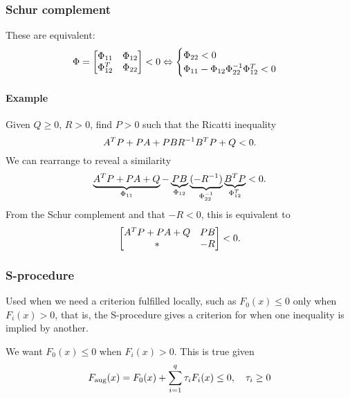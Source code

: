 \subsubsection{Schur complement}
These are equivalent:
\begin{equation}
  \Phi =
  \begin{bmatrix}
    \Phi_{11} & \Phi_{12} \\
    \Phi_{12}^{T} & \Phi_{22}
  \end{bmatrix}
  < 0
  \Leftrightarrow
  \begin{cases}
    \Phi_{22} < 0 \\
    \Phi_{11} - \Phi_{12} \Phi_{22}^{-1} \Phi_{12}^{T} < 0
  \end{cases}
\end{equation}

\paragraph{Example} Given $Q \geq 0$, $R > 0$, find $P > 0$ such that the Ricatti inequality
%
\begin{equation}
  A^{T} P + PA + PBR^{-1}B^{T} P + Q < 0.
\end{equation}
%
We can rearrange to reveal a similarity
%
\begin{equation}
  \underbrace{A^{T} P + PA + Q}_{\Phi_{11}}
  -
  \underbrace{PB}_{\Phi_{12}}
  \underbrace{(-R^{-1})}_{\Phi_{22}^{-1}}
  \underbrace{B^{T} P}_{\Phi_{12}^{T}}
  < 0.
\end{equation}
%
From the Schur complement and that $-R < 0$, this is equivalent to
%
\begin{equation}
  \begin{bmatrix}
    A^{T} P + PA + Q & PB \\
    * & -R
  \end{bmatrix}
  < 0.
\end{equation}

\subsubsection{S-procedure}
Used when we need a criterion fulfilled locally, such as $F_0(x) \leq 0$ only when $F_i(x) > 0$, that is, the S-procedure gives a criterion for when one inequality is implied by another.

We want $F_0(x) \leq 0$ when $F_i(x) > 0$. This is true given
%
\begin{equation}
  F_\mathrm{aug}(x) = F_0(x) + \sum_{i=1}^q \tau_i F_i(x) \leq 0, \quad \tau_i \geq 0
\end{equation}

